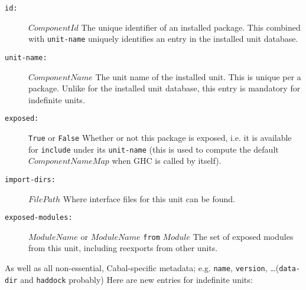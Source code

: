 \documentclass{article}
\newcommand{\I}[1]{\ensuremath{\mathit{#1}}}
\begin{document}
\begin{description}
    \item[\texttt{id:}] \I{ComponentId} \newline
        The unique identifier of an installed package.  This combined
        with \texttt{unit-name} uniquely identifies an entry in the
        installed unit database.
    \item[\texttt{unit-name:}] \I{ComponentName} \newline
        The unit name of the installed unit.  This is unique per a package.
        Unlike for the installed unit database, this entry is mandatory for
        indefinite units.
    \item[\texttt{exposed:}] \verb|True| or \verb|False| \newline
        Whether or not this package is exposed, i.e. it is available for
        \verb|include| under its \verb|unit-name| (this is used to compute
        the default \I{ComponentNameMap} when GHC is called by itself).
    \item[\texttt{import-dirs:}] \I{FilePath} \newline
        Where interface files for this unit can be found.
    \item[\texttt{exposed-modules:}] \I{ModuleName} or \I{ModuleName} \texttt{from} \I{Module} \newline
        The set of exposed modules from this unit, including reexports from
        other units.
\end{description}
%
As well as all non-essential, Cabal-specific metadata; e.g. \texttt{name}, \texttt{version}, \ldots (\texttt{data-dir} and \texttt{haddock} probably)
Here are new entries for indefinite units:
\end{document}
